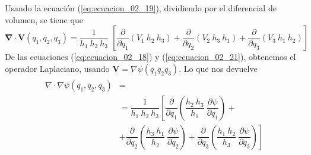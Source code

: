 Usando la ecuación (\ref{eq:ecuacion_02_19}), dividiendo por el diferencial de volumen, se tiene que
\begin{equation}
\bm{\nabla \cdot V}(q_{1}, q_{2}, q_{3}) = \dfrac{1}{h_{1} \: h_{2} \: h_{3}} \; \left[ \dfrac{\partial}{\partial q_{1}} (V_{1} \: h_{2} \: h_{3}) + \dfrac{\partial}{\partial q_{2}} (V_{2}  \:h_{3} \: h_{1}) + \dfrac{\partial}{\partial q_{3}} (V_{3} \: h_{1} \: h_{2})   \right]
\label{eq:ecuacion_02_21}
\end{equation}
De las ecuaciones (\ref{eq:ecuacion_02_18}) y (\ref{eq:ecuacion_02_21}), obtenemos el operador Laplaciano, usando $\mathbf{V} = \nabla \psi(q_{1} q_{2} q_{3})$. Lo que nos devuelve
\begin{eqnarray}
\begin{aligned}
\nabla \cdot \nabla \psi (q_{1}, q_{2}, q_{3}) &= \\
&= \dfrac{1}{h_{1} \: h_{2} \: h_{3}} \left[ \dfrac{\partial}{\partial q_{1}} \left( \dfrac{h_{2} \: h_{3}}{h_{1}} \: \dfrac{\partial \psi}{\partial q_{1}} \right) + \right. \\
&+ \left.  \dfrac{\partial}{\partial q_{2}} \left( \dfrac{h_{3} \: h_{1}}{h_{2}} \: \dfrac{\partial \psi}{\partial q_{2}} \right) + \dfrac{\partial}{\partial q_{3}} \left( \dfrac{h_{1} \: h_{2}}{h_{3}} \: \dfrac{\partial \psi}{\partial q_{3}} \right) \right]  
\end{aligned}
\label{eq:ecuacion_02_22}
\end{eqnarray}
